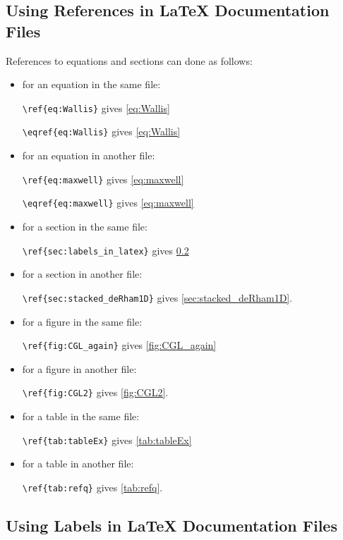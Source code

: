 \documentclass[11pt]{article}
\begin{document}
\subsection{Using References in LaTeX Documentation Files}
\label{sec:refs_in_latex}

References to equations and sections can done as follows:

\begin{itemize}
    \item for an equation in the same file:
    
    \verb|\ref{eq:Wallis}| gives \ref{eq:Wallis}

    \verb|\eqref{eq:Wallis}| gives \eqref{eq:Wallis} 

    \item for an equation in another file:
    
    \verb|\ref{eq:maxwell}| gives \ref{eq:maxwell}

    \verb|\eqref{eq:maxwell}| gives \eqref{eq:maxwell}

    \item for a section in the same file:
    
    \verb|\ref{sec:labels_in_latex}| gives \ref{sec:labels_in_latex} 

    \item for a section in another file:
    
    \verb|\ref{sec:stacked_deRham1D}| gives \ref{sec:stacked_deRham1D}.

    \item for a figure in the same file:
    
    \verb|\ref{fig:CGL_again}| gives \ref{fig:CGL_again} 

    \item for a figure in another file:
    
    \verb|\ref{fig:CGL2}| gives \ref{fig:CGL2}.

    \item for a table in the same file:
    
    \verb|\ref{tab:tableEx}| gives \ref{tab:tableEx} 

    \item for a table in another file:
    
    \verb|\ref{tab:refq}| gives \ref{tab:refq}.

\end{itemize}


\subsection{Using Labels in LaTeX Documentation Files}
\label{sec:labels_in_latex}
\end{document}
